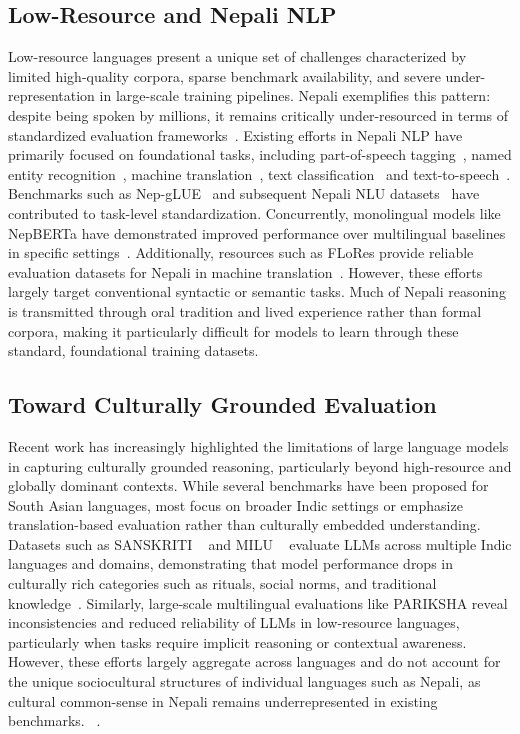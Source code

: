 \documentclass[10pt, a4paper]{article}
\begin{document}
\subsection{Low-Resource and Nepali NLP}

Low-resource languages present a unique set of challenges characterized by limited high-quality corpora, sparse benchmark availability, and severe under-representation in large-scale training pipelines. Nepali exemplifies this pattern: despite being spoken by millions, it remains critically under-resourced in terms of standardized evaluation frameworks~\cite{cahyawijaya2024llm}. Existing efforts in Nepali NLP have primarily focused on foundational tasks, including part-of-speech tagging~\cite{pradhan2024parts}, named entity recognition~\cite{singh2019named}, machine translation~\cite{shahi2022natural}, text classification~\cite{prabha2018deep} and text-to-speech~\cite{khadka2023tts}. Benchmarks such as Nep-gLUE~\cite{timilsina2022nepberta} and subsequent Nepali NLU datasets~\cite{nyachhyon2025consolidating} have contributed to task-level standardization. Concurrently, monolingual models like NepBERTa have demonstrated improved performance over multilingual baselines in specific settings~\cite{timilsina2022nepberta}. Additionally, resources such as FLoRes provide reliable evaluation datasets for Nepali in machine translation~\cite{guzman2019flores}. However, these efforts largely target conventional syntactic or semantic tasks. Much of Nepali reasoning is transmitted through oral tradition and lived experience rather than formal corpora, making it particularly difficult for models to learn through these standard, foundational training datasets.

\subsection{Toward Culturally Grounded Evaluation}

Recent work has increasingly highlighted the limitations of large language models in capturing culturally grounded reasoning, particularly beyond high-resource and globally dominant contexts. While several benchmarks have been proposed for South Asian languages, most focus on broader Indic settings or emphasize translation-based evaluation rather than culturally embedded understanding. Datasets such as SANSKRITI ~\cite{maji2025sanskriti} and MILU ~\cite{verma2025milu} evaluate LLMs across multiple Indic languages and domains, demonstrating that model performance drops in culturally rich categories such as rituals, social norms, and traditional knowledge~\cite{joshi2025elr}. Similarly, large-scale multilingual evaluations like PARIKSHA reveal inconsistencies and reduced reliability of LLMs in low-resource languages, particularly when tasks require implicit reasoning or contextual awareness. However, these efforts largely aggregate across languages and do not account for the unique sociocultural structures of individual languages such as Nepali, as cultural common-sense in Nepali remains underrepresented in existing benchmarks. ~\cite{chiu2025culturalbenchrobustdiversechallenging}.
\end{document}
